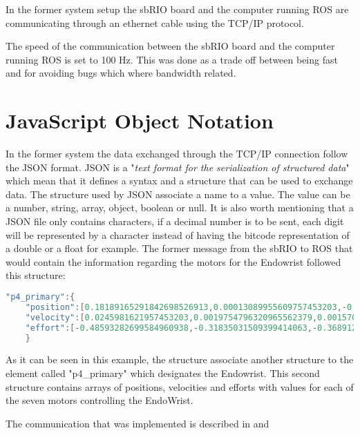 

In the former system setup the sbRIO board and the computer running ROS are communicating through an ethernet cable using the TCP/IP protocol.

The speed of the communication between the sbRIO board and the computer running ROS is set to 100 Hz. This was done as a trade off between being fast and for avoiding bugs which where bandwidth related\cite{Chris_Surgical}.

\section{JavaScript Object Notation}\label{subsec:JSON}
In the former system the data exchanged through the TCP/IP connection follow the \gls{JSON} format. \gls{JSON} is a "\textit{text format for the serialization of structured data}"\cite{JSON_IETF} which mean that it defines a syntax and a structure that can be used to exchange data. The structure used by \gls{JSON} associate a name to a value. The value can be a number, string, array, object, boolean or null. It is also worth mentioning that a \gls{JSON} file only contains characters, if a decimal number is to be sent, each digit will be represented by a character instead of having the bitcode representation of a double or a float for example. The former message from the sbRIO to ROS that would contain the information regarding the motors for the Endowrist followed this structure:

\begin{lstlisting}[language=C]
"p4_primary":{
	"position":[0.18189165291842698526913,0.00013089955609757453203,-0.0001266769975192886591,-0.1987191723699879841951,0.005448952358949832479,-0.075542398123354895423,0.34975197863262971333179],
	"velocity":[0.0245981621957453203,0.0019754796320965562379,0.0015707947313785552979,0.00013089955609757453203,-0.08079910119712697,0.00179230726818657365132,0.36846987598741655653203],
	"effort":[-0.48593282699584960938,-0.31835031509399414063,-0.36891269683837890625,-0.39591121673583984375,0.15245248632456985325663,0.32147856985321569887862,0.24789/86568745221455553]
	}
\end{lstlisting}

As it can be seen in this example, the structure associate another structure to the element called "p4\_primary" which designates the Endowrist. This second structure contains arrays of positions, velocities and efforts with values for each of the seven motors controlling the EndoWrist.

The communication that was implemented is described in  and 